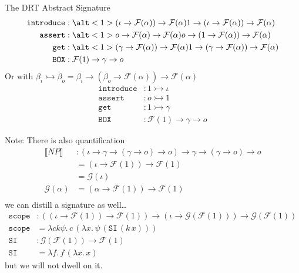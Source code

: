 \documentclass{beamer}
\newcommand{\sem}[1]{\llbracket #1 \rrbracket}
\newcommand{\lam}[2]{\lambda #1.\, #2}
\newcommand{\ap}[2]{#1\,#2}
\newcommand{\op}[1]{\mathtt{#1}}
\newcommand{\FF}{\mathcal{F}}
\newcommand{\GG}{\mathcal{G}}
\newcommand{\boxop}{\texttt{BOX}}
\newcommand{\scope}{\texttt{scope}}
\newcommand{\siop}{\texttt{SI}}
\begin{document}
\begin{frame}{The DRT Abstract Signature}
  \begin{align*}
    \op{introduce} &: \alt<1>{(\iota \to \FF(\alpha)) \to \FF(\alpha)}
                             {1 \to (\iota \to \FF(\alpha)) \to \FF(\alpha)} \\
    \op{assert} &: \alt<1>{o \to \FF(\alpha) \to \FF(\alpha)}
                          {o \to (1 \to \FF(\alpha)) \to \FF(\alpha)} \\
    \op{get} &: \alt<1>{(\gamma \to \FF(\alpha)) \to \FF(\alpha)}
                       {1 \to (\gamma \to \FF(\alpha)) \to \FF(\alpha)}\\
    \boxop &: \FF(1) \to \gamma \to o
  \end{align*}
  \pause \pause \vfill Or with $\beta_i \rightarrowtail \beta_o = \beta_i
  \to (\beta_o \to \FF(\alpha)) \to \FF(\alpha)$
  \begin{align*}
    \op{introduce} &: 1 \rightarrowtail \iota \\
    \op{assert} &: o \rightarrowtail 1 \\
    \op{get} &: 1 \rightarrowtail \gamma \\
    \boxop &: \FF(1) \to \gamma \to o
  \end{align*}
\end{frame}

\begin{frame}{Note: There is also quantification}
  \begin{align*}
    \sem{NP} &: (\iota \to \gamma \to (\gamma \to o) \to o) \to \gamma \to (\gamma \to o) \to o \\
    &= (\iota \to \FF(1)) \to \FF(1) \\
    &= \GG(\iota) \\
    \GG(\alpha) &= (\alpha \to \FF(1)) \to \FF(1) \\
  \end{align*}
  \pause
  we can distill a signature as well\ldots
  \begin{align*}
    \scope &: ((\iota \to \FF(1)) \to \FF(1)) \to (\iota \to \GG(\FF(1))) \to \GG(\FF(1)) \\
    \scope &= \lam{c k \psi}{\ap{c}{(\lam{x}{\ap{\psi}{(\ap{\siop}{(\ap{k}{x})})}})}} \\
    \siop &: \GG(\FF(1)) \to \FF(1) \\
    \siop &= \lam{f}{\ap{f}{(\lam{x}{x})}}
  \end{align*}
  \pause
  but we will not dwell on it.
\end{frame}
\end{document}
